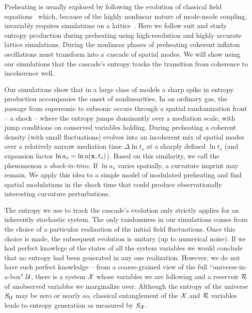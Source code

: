 \documentclass[11pt,a4paper]{article}
\begin{document}
Preheating is usually explored by following the evolution of classical field equations~\cite{Kofman:1994rk,Kofman:1997yn,Traschen:1990sw,Shtanov:1994ce} which, because of the highly nonlinear nature of mode-mode coupling, invariably requires simulations on a lattice~\cite{Felder:2000hq,Frolov:2008hy,Huang:2011gf,Easther:2010qz,Sainio:2012mw}. Here we follow suit and study entropy production during preheating using high-resolution and highly accurate lattice simulations. During the nonlinear phases of preheating coherent inflaton oscillations must transform into a cascade of spatial modes. We will show using our simulations that the cascade's entropy tracks the transition from coherence to incoherence well.

Our simulations show that in a large class of models a sharp spike in entropy production accompanies the onset of nonlinearities. In an ordinary  gas,  the passage from supersonic to subsonic occurs through a spatial randomization front -- a shock -- where the entropy jumps dominantly over a mediation scale, with jump conditions on conserved variables holding. 
During preheating a coherent density (with small fluctuations) evolves into an incoherent mix of spatial modes 
over a relatively narrow mediation time $\Delta \ln t_s$ at a sharply defined $\ln t_s$ (and expansion factor $\ln a_s = \ln a ({\bf x}, t_s)$). 
Based on this similarity, we call the phenomenon a {\it shock-in-time}. 
If $\ln a_s $ varies spatially, a curvature imprint may remain. 
We apply this idea to a simple model of modulated preheating and find spatial modulations in the shock time that could produce observationally interesting curvature perturbations. 

The entropy we use to track the cascade's evolution only strictly applies for an inherently stochastic system. %
The only randomness in our simulations comes from the choice of a particular realization of the initial field fluctuations. Once this choice is made, the subsequent evolution is unitary (up to numerical noise). If we had perfect knowlege of the states of all the system variables we would conclude that no entropy had been generated in any one realization. However, we do not have such perfect knowledge -- from a coarse-grained view of the full ``universe-in-a-box" ${\cal U}$, there is a system ${\cal X}$ whose variables we are following and a reservoir ${\cal R}$ of unobserved variables we marginalize over. Although the entropy of the universe $S_{\cal U}$ may be zero or nearly so, classical entanglement of the ${\cal X}$ and ${\cal R}$ variables leads to entropy generation as measured by $S_{\cal X}$.
\end{document}
